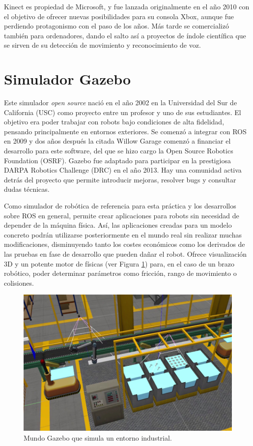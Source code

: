 \documentclass[12pt,spanish,chapterprefix, numbers=noenddot]{book}
\numberwithin{equation}{section}
\numberwithin{figure}{section}
\begin{document}
Kinect es propiedad de Microsoft, y fue lanzada originalmente en el año 2010 con el objetivo de ofrecer nuevas posibilidades para su consola Xbox, aunque fue perdiendo protagonismo con el paso de los años. Más tarde se comercializó también para ordenadores, dando el salto así a proyectos de índole científica que se sirven de su detección de movimiento y reconocimiento de voz. 

\section{Simulador Gazebo}
Este simulador \textit{open source} nació en el año 2002 en la Universidad del Sur de California (USC) como proyecto entre un profesor y uno de sus estudiantes. El objetivo era poder trabajar con robots bajo condiciones de alta fidelidad, pensando principalmente en entornos exteriores. Se comenzó a integrar con ROS en 2009 y dos años después la citada Willow Garage comenzó a financiar el desarrollo para este software, del que se hizo cargo la Open Source Robotics Foundation (OSRF).
Gazebo \cite{gazebo} fue adaptado para participar en la prestigiosa DARPA Robotics Challenge (DRC) en el año 2013. Hay una comunidad activa detrás del proyecto que permite introducir mejoras, resolver bugs y consultar dudas técnicas.

Como simulador de robótica de referencia para esta práctica y los desarrollos sobre ROS en general, permite crear aplicaciones para robots sin necesidad de depender de la máquina física. Así, las aplicaciones creadas para un modelo concreto podrán utilizarse posteriormente en el mundo real sin  realizar muchas modificaciones, disminuyendo tanto los costes económicos como los derivados de las pruebas en fase de desarrollo que pueden dañar el robot. 
Ofrece visualización 3D y un potente motor de físicas (ver Figura \ref{fig:gazeboExample}) para, en el caso de un brazo robótico, poder determinar parámetros como fricción, rango de movimiento o colisiones.

\begin{figure}[hbt!]
\centering
\includegraphics[width=12cm]{Figs/gazebo_example.jpg}
\par
\caption{\label{fig:gazeboExample}Mundo Gazebo que simula un entorno industrial.}
\end{figure}
\end{document}
